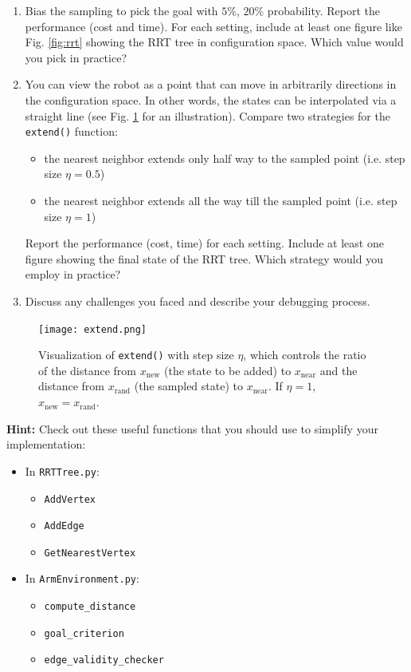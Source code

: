 \documentclass[tp]{lcc}
\begin{document}
\begin{enumerate}
    \item Bias the sampling to pick the goal with $5\%$, $20\%$ probability. Report the performance (cost and time). For each setting, include at least one figure like Fig. \ref{fig:rrt} showing the RRT tree in configuration space. Which value would you pick in practice?
    \item You can view the robot as a point that can move in arbitrarily directions in the configuration space. In other words, the states can be interpolated via a straight line (see Fig. \ref{fig:extend} for an illustration). Compare two strategies for the \texttt{extend()} function:
    \begin{itemize}
        \item the nearest neighbor extends only half way to the sampled point (i.e. step size $\eta=0.5$)
        \item the nearest neighbor extends all the way till the sampled point (i.e. step size $\eta=1$)
    \end{itemize}
    Report the performance (cost, time) for each setting. Include at least one figure showing the final state of the RRT tree. Which strategy would you employ in practice?
    \item Discuss any challenges you faced and describe your debugging process.
\end{enumerate}

\begin{figure}[h]
    \centering
    \texttt{[image: extend.png]}
    \caption{Visualization of \texttt{extend()} with step size $\eta$, which controls the ratio of the distance from $x_{\text{new}}$ (the state to be added) to $x_{\text{near}}$ and the distance from $x_{\text{rand}}$ (the sampled state) to $x_{\text{near}}$. If $\eta=1$, $x_{\text{new}}=x_{\text{rand}}$.}
    \label{fig:extend}
\end{figure}

\textbf{Hint:}
Check out these useful functions that you should use to simplify your implementation:
\begin{itemize}
    \item In \texttt{RRTTree.py}:
    \begin{itemize}
        \item \texttt{AddVertex}
        \item \texttt{AddEdge}
        \item \texttt{GetNearestVertex}
    \end{itemize}
    \item In \texttt{ArmEnvironment.py}:
    \begin{itemize}
        \item \texttt{compute\_distance}
        \item \texttt{goal\_criterion}
        \item \texttt{edge\_validity\_checker}
    \end{itemize}
\end{itemize}
\end{document}

